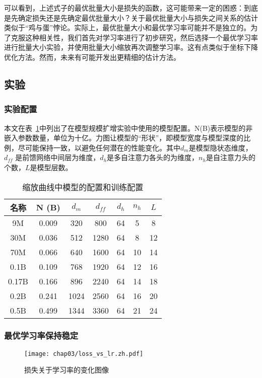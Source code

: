 可以看到，上述式子的最优批量大小是损失的函数，这可能带来一定的困惑：到底是先确定损失还是先确定最优批量大小？关于最优批量大小与损失之间关系的估计类似于“鸡与蛋”悖论。实际上，最优批量大小和最优学习率可能并不是独立的。为了克服这种相关性，我们首先对学习率进行了初步研究，然后选择一个最优学习率进行批量大小实验，并使用批量大小缩放再次调整学习率。这有点类似于坐标下降优化方法。然而，未来有可能开发出更精细的估计方法。


\subsection{实验}

\subsubsection{实验配置}
本文在表~\ref{tab:appmodel_configs}中列出了在模型规模扩增实验中使用的模型配置。N(B)表示模型的非嵌入参数数量，单位为十亿。力图让模型的“形状”，即模型宽度与模型深度的比例，尽可能保持一致，以避免任何潜在的性能变化。其中$d_m$是模型隐状态维度，$d_{ff}$ 是前馈网络中间层为维度，$d_h$是多自注意力各头的为维度，$n_h$是自注意力头的个数，$L$是模型层数。

\begin{table}[htbp]
    \centering
    \caption{缩放曲线中模型的配置和训练配置}
    \begin{tabular}{c|cccccc}
    \toprule
        \textbf{名称} & \textbf{N (B)}& $d_m$ & $d_{ff}$ &$d_h$ & $n_h$ & $L$ \\
    \midrule
          9M    &  0.009 & 320 & 800 & 64 & 5 & 8\\
           30M &   0.036 & 512 & 1280 & 64 & 8 & 12  \\
          70M &  0.066 & 640 & 1600 & 64 & 10 & 14\\
          0.1B &  0.109 & 768 & 1920 & 64 & 12 & 16  \\
         0.17B &  0.166 & 896 & 2240 & 64 & 14 & 18 \\
         0.2B&  0.241 & 1024 & 2560 & 64 & 16 & 20 \\
        0.5B& 0.499 & 1344 & 3360 & 64 & 21 & 24 \\
    \bottomrule
    \end{tabular}
    \label{tab:appmodel_configs}
\end{table}


\subsubsection{最优学习率保持稳定}
\begin{figure}[!htbp]
  \centering
      \centering
      \texttt{[image: chap03/loss\_vs\_lr.zh.pdf]}
      \caption{损失关于学习率的变化图像}
      \label{fig:loss_vs_lr}
\end{figure}

